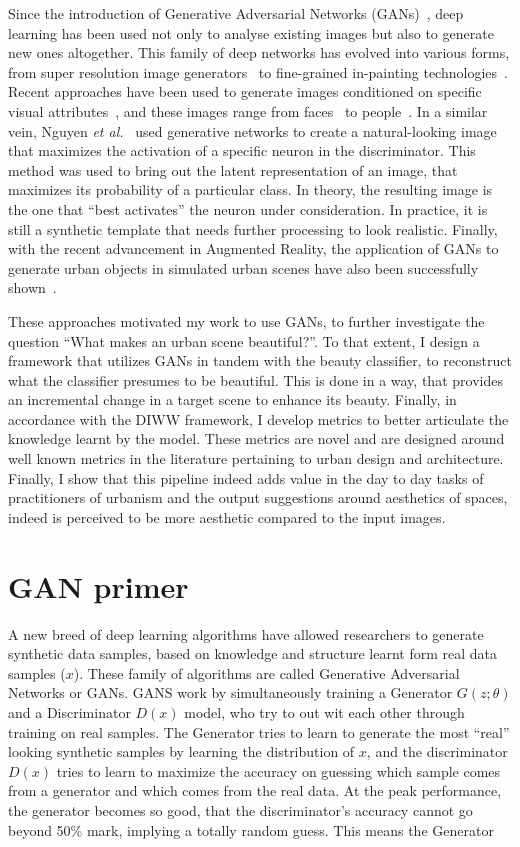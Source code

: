 Since the introduction of Generative Adversarial Networks (GANs)~\cite{goodfellow2014generative}, deep learning has been used not only to analyse existing images but also to generate new ones altogether. This family of deep networks has evolved into various forms, from super resolution image generators~\cite{ledig2017photo} to fine-grained in-painting technologies~\cite{pathak2016context}. Recent approaches have been used to generate images conditioned on specific visual attributes~\cite{yan2015attribute2image}, and these images range from faces~\cite{taigman2016unsupervised} to people~\cite{ma2018disentangled}. In a similar vein, Nguyen \emph{et al.}~\cite{nguyen2016synthesizing} used generative networks to create a natural-looking image that maximizes the activation of a specific neuron in the discriminator. This method was used to bring out the latent representation of an image, that maximizes its probability of a particular class. In theory, the resulting image is the one that ``best activates'' the neuron under consideration. In practice, it is still a synthetic template that needs further processing to look realistic.   Finally, with the recent advancement in Augmented Reality, the application of GANs to generate urban objects in simulated urban scenes have also been successfully shown~\cite{alhaija2018augmented}. 

These approaches motivated my work to use GANs, to further investigate the question ``What makes an urban scene beautiful?''. To that extent, I design a framework that utilizes GANs in tandem with the beauty classifier, to reconstruct what the classifier presumes to be beautiful. This is done in a way, that provides an incremental change in a target scene to enhance its beauty. Finally, in accordance with the DIWW framework, I develop metrics to better articulate the knowledge learnt by the model. These metrics are novel and are designed around well known metrics in the literature pertaining to urban design and architecture. 
Finally, I show that this pipeline indeed adds value in the day to day tasks of practitioners of urbanism and the output suggestions around aesthetics of spaces, indeed is perceived to be more aesthetic compared to the input images. 

\section{GAN primer}
A new breed of deep learning algorithms have allowed researchers to generate synthetic data samples, based on knowledge and structure learnt form real data samples ($x$). These family of algorithms are called Generative Adversarial Networks or GANs. GANS work by simultaneously training a Generator $G(z;\theta)$ and a Discriminator $D(x)$ model, who try to out wit each other through training on real samples. The Generator tries to learn to generate the most ``real'' looking synthetic samples by learning the distribution of $x$, and the discriminator $D(x)$ tries to learn to maximize the accuracy on guessing which sample comes from a generator and which comes from the real data. At the peak performance, the generator becomes so good, that the discriminator's accuracy cannot go beyond 50\% mark, implying a totally random guess. This means the Generator 


